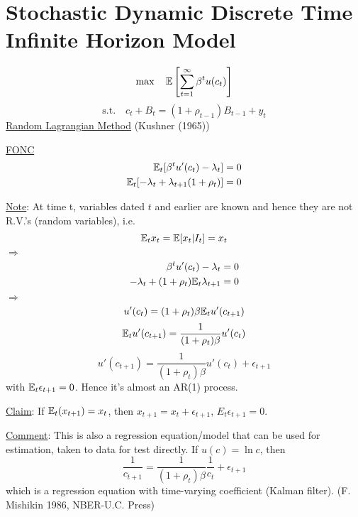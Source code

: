 \documentclass[twoside]{article}
\newcommand\imp{$\Longrightarrow$}
\newcommand\lsb{\left [}
\newcommand\rsb{\right ]}
\begin{document}
\section{Stochastic Dynamic Discrete Time Infinite Horizon Model}
\begin{equation}
    \max \quad \E \lsb \sum_{t=1}^{\infty} \beta^{t} u(c_{t})  \rsb 
\end{equation}
\begin{equation}
    \text{s.t.} \quad c_t + B_{t} = (1+ \rho_{t-1}) B_{t-1} + y_{t}
\end{equation}
\underline{Random Lagrangian Method} (Kushner (1965))

\underline{FONC}
\begin{eqnarray}
    \mathbb{E}_{t} [ \beta^{t} u'(c_{t}) - \lambda_{t}] = 0\\
    \mathbb{E}_{t} [ - \lambda_{t} + \lambda_{t+1} (1+ \rho_{t})] = 0
\end{eqnarray}

\underline{Note}: At time t, variables dated $t$ and earlier are known and hence they are not R.V.'s (random variables), i.e.
\begin{equation}
    \mathbb{E}_{t} x_{t} = \mathbb{E} [x_{t} | I_{t} ] = x_{t}
\end{equation}
\imp
\begin{eqnarray}
    \beta^{t} u'(c_{t}) - \lambda_{t} = 0\\
    -\lambda_{t} + (1 + \rho_{t}) \mathbb{E}_{t} \lambda_{t+1} = 0
\end{eqnarray}
\imp    
\begin{equation}
    u'(c_{t}) = (1 + \rho_{t}) \beta \mathbb{E}_{t} u'(c_{t+1})
\end{equation}
\begin{equation}
    \mathbb{E}_{t} u'(c_{t+1}) = \frac{1}{(1 + \rho_{t}) \beta} u'(c_{t})
\end{equation}
\begin{equation}
    u'(c_{t+1}) = \frac{1}{(1 + \rho_{t}) \beta} u'(c_{t}) + \epsilon_{t+1}
\end{equation}
with $\mathbb{E}_{t} \epsilon_{t+1} = 0$. Hence it's almost an AR(1) process.

\underline{Claim}: If $\mathbb{E}_t (x_{t+1}) = x_{t}$, then $x_{t+1} = x_{t} + \epsilon_{t+1}$, $E_{t} \epsilon_{t+1} = 0$.

\underline{Comment}: This is also a regression equation/model that can be used for estimation, taken to data for test directly. If $u(c) = \ln c$, then \begin{equation}
    \frac{1}{c_{t+1}} = \frac{1}{(1 + \rho_{t}) \beta}  \frac{1}{c_{t}} + \epsilon_{t+1}
\end{equation}
which is a regression equation with time-varying coefficient (Kalman filter). (F. Mishikin 1986, NBER-U.C. Press)
\end{document}
